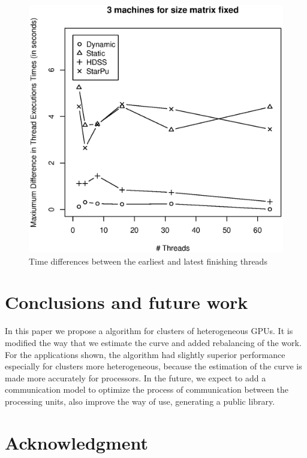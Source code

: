 \documentclass[journal]{IEEEtran}
\begin{document}
\begin{figure}[htb]
	\begin{center}
	\centering
			\includegraphics[scale=0.4]{MaximaDiferencaBlack.eps}
	\caption{Time differences between the earliest and latest finishing threads}
	\label{fig:diferencaThreadsBlack}
	\end{center}
\end{figure}


\section{Conclusions and future work}


In this paper we propose a algorithm for clusters of heterogeneous GPUs. It is modified the way that we estimate the curve and added rebalancing of the work. For the applications shown, the algorithm had slightly superior performance especially for clusters more heterogeneous, because the estimation of the curve is made more accurately for processors. In the future, we expect to add a communication model to optimize the process of communication between the processing units, also improve the way of use,  generating a public library.


\section*{Acknowledgment}
\end{document}
